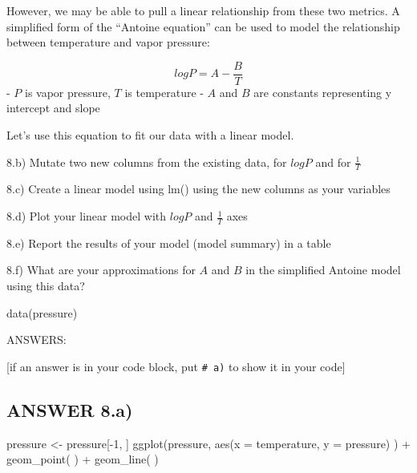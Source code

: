 \documentclass[
]{article}
\newenvironment{Shaded}{\begin{snugshade}}{\end{snugshade}}
\newcommand{\AttributeTok}[1]{\textcolor[rgb]{0.77,0.63,0.00}{#1}}
\newcommand{\DecValTok}[1]{\textcolor[rgb]{0.00,0.00,0.81}{#1}}
\newcommand{\FunctionTok}[1]{\textcolor[rgb]{0.00,0.00,0.00}{#1}}
\newcommand{\NormalTok}[1]{#1}
\newcommand{\OtherTok}[1]{\textcolor[rgb]{0.56,0.35,0.01}{#1}}
\newcommand{\SpecialCharTok}[1]{\textcolor[rgb]{0.00,0.00,0.00}{#1}}
\begin{document}
However, we may be able to pull a linear relationship from these two
metrics. A simplified form of the ``Antoine equation'' can be used to
model the relationship between temperature and vapor pressure:

\[log{P} = A - \frac{B}{T}\] - \(P\) is vapor pressure, \(T\) is
temperature - \(A\) and \(B\) are constants representing y intercept and
slope

Let's use this equation to fit our data with a linear model.

8.b) Mutate two new columns from the existing data, for \(log{P}\) and
for \(\frac{1}{T}\)

8.c) Create a linear model using lm() using the new columns as your
variables

8.d) Plot your linear model with \(log{P}\) and \(\frac{1}{T}\) axes

8.e) Report the results of your model (model summary) in a table

8.f) What are your approximations for \(A\) and \(B\) in the simplified
Antoine model using this data?

\begin{Shaded}
\begin{Highlighting}[]
\FunctionTok{data}\NormalTok{(pressure)}
\end{Highlighting}
\end{Shaded}

ANSWERS:

{[}if an answer is in your code block, put \texttt{\#\ a)} to show it in
your code{]}

\hypertarget{answer-8.a}{%
\subsection{ANSWER 8.a)}\label{answer-8.a}}

\begin{Shaded}
\begin{Highlighting}[]
\NormalTok{pressure }\OtherTok{\textless{}{-}}\NormalTok{ pressure[}\SpecialCharTok{{-}}\DecValTok{1}\NormalTok{, ]}
\FunctionTok{ggplot}\NormalTok{(pressure,}
       \FunctionTok{aes}\NormalTok{(}\AttributeTok{x =}\NormalTok{ temperature, }\AttributeTok{y =}\NormalTok{ pressure)}
\NormalTok{       ) }\SpecialCharTok{+} \FunctionTok{geom\_point}\NormalTok{(}
\NormalTok{       ) }\SpecialCharTok{+} \FunctionTok{geom\_line}\NormalTok{(}
\NormalTok{       )}
\end{Highlighting}
\end{Shaded}
\end{document}
